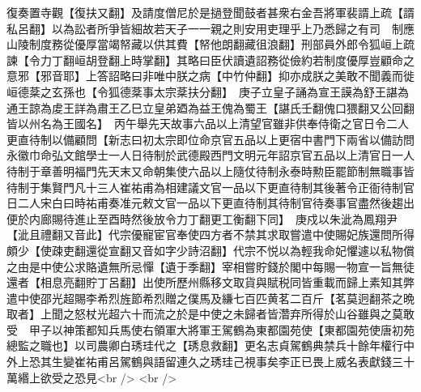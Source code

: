 復奏置寺觀【復扶又翻】及請度僧尼於是撾登聞鼓者甚衆右金吾將軍裴諝上疏【諝私呂翻】以為訟者所爭皆細故若天子一一親之則安用吏理乎上乃悉歸之有司　制應山陵制度務從優厚當竭帑藏以供其費【帑他朗翻藏徂浪翻】刑部員外郎令狐峘上疏諫【令力丁翻峘胡登翻上時掌翻】其略曰臣伏讀遺詔務從儉約若制度優厚豈顧命之意邪【邪音耶】上答詔略曰非唯中朕之病【中竹仲翻】抑亦成朕之美敢不聞義而徙峘德棻之玄孫也【令狐德棻事太宗棻扶分翻】　庚子立皇子誦為宣王謨為舒王諶為通王諒為䖍王詳為肅王乙巳立皇弟廼為益王傀為蜀王【諶氏壬翻傀口猥翻又公回翻皆以州名為王國名】　丙午舉先天故事六品以上清望官雖非供奉侍衛之官日令二人更直待制以備顧問【新志曰初太宗即位命京官五品以上更宿中書門下兩省以備訪問永徽巾命弘文館學士一人日待制於武德殿西門文明元年詔京官五品以上清官日一人待制于章善明福門先天末又命朝集使六品以上隨仗待制永泰時勲臣罷節制無職事皆待制于集賢門凡十三人崔祐甫為相建議文官一品以下更直待制其後著令正衙待制官日二人宋白曰時祐甫奏准元敕文官一品以下更直待制其待制官待奏事官盡然後趨出便於内廊賜待進止至酉時然後放令力丁翻更工衡翻下同】　庚戍以朱泚為鳳翔尹【泚且禮翻又音此】代宗優寵宦官奉使四方者不禁其求取嘗遣中使賜妃族還問所得頗少【使疎吏翻還從宣翻又音如字少詩沼翻】代宗不悦以為輕我命妃懼遽以私物償之由是中使公求賂遺無所忌憚【遺于季翻】宰相嘗貯錢於閣中每賜一物宣一旨無徒還者【相息亮翻貯丁呂翻】出使所歷州縣移文取貨與賦税同皆重載而歸上素知其弊遣中使邵光超賜李希烈旌節希烈贈之僕馬及縑七百匹黄茗二百斤【茗莫迥翻茶之晩取者】上聞之怒杖光超六十而流之於是中使之未歸者皆濳弃所得於山谷雖與之莫敢受　甲子以神策都知兵馬使右領軍大將軍王駕鶴為東都園苑使【東都園苑使唐初苑總監之職也】以司農卿白琇珪代之【琇息救翻】更名志貞駕鶴典禁兵十餘年權行中外上恐其生變崔祐甫呂駕鶴與語留連久之琇珪己視事矣李正已畏上威名表獻錢三十萬緡上欲受之恐見<br />
<br />
